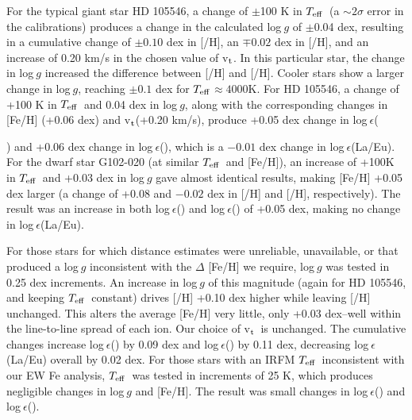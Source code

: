 \documentclass[12pt,preprint]{aastex}
\def\teff{\mbox{$T_{\rm {eff}}$}}
\def\vt{\mbox{v$_{\rm t}$}}
\begin{document}
For the typical giant star HD 105546, a change of $\pm$100 K in \teff~(a $\sim 2 \sigma$ error in the \citet{AlonsoDwarf, AlonsoGiant} calibrations) produces a change in the calculated log$~g$ of $\pm$0.04 dex, resulting in a cumulative change of $\pm 0.10$ dex in [/H],  an $\mp 0.02$ dex in [/H], and an increase of 0.20 km/s in the  chosen value of \vt.  In this particular star, the change in log$~g$ increased the difference between [/H] and [/H].  Cooler stars show a larger change in log$~g$, reaching $\pm 0.1$ dex for \teff$\approx 4000$K. For HD 105546, a change of +100 K in \teff~and 0.04 dex in log$~g$, along with the corresponding changes in [Fe/H] (+0.06 dex) and \vt (+0.20 km/s), produce +0.05 dex change in log$~\epsilon$({) and +0.06 dex change in log$~\epsilon$(), which is a $-0.01$ dex change in log$~\epsilon$(La/Eu).  For the dwarf star G102-020 (at similar \teff~and [Fe/H]), an increase  of +100K in \teff~and +0.03 dex in log$~g$ gave almost identical results, making [Fe/H] +0.05 dex larger (a change of +0.08 and $-0.02$ dex in [/H] and [/H], respectively).  The result was an increase in both log$~\epsilon$() and log$~\epsilon$() of +0.05 dex, making no change in log$~\epsilon$(La/Eu).  

For those stars for which distance estimates were unreliable, unavailable, or that produced a log$~g$ inconsistent with the $\Delta$ [Fe/H] we require, log$~g$ was tested in 0.25 dex increments.  An increase in log$~g$ of this magnitude (again for HD 105546, and keeping \teff~constant) drives [/H] +0.10 dex higher while leaving [/H] unchanged.  This alters the average [Fe/H] very little, only +0.03 dex--well within the line-to-line spread of each ion.  Our choice of \vt~is unchanged.  The cumulative changes increase  log$~\epsilon$() by 0.09 dex and  log$~\epsilon$() by 0.11 dex, decreasing log$~\epsilon$(La/Eu) overall by 0.02 dex.  For those stars with an IRFM \teff~inconsistent with our EW Fe  analysis, \teff~was tested in increments of 25 K, which produces negligible changes in log$~g$ and [Fe/H].  The result was small changes in log$~\epsilon$() and log$~\epsilon$().   

}
\end{document}
